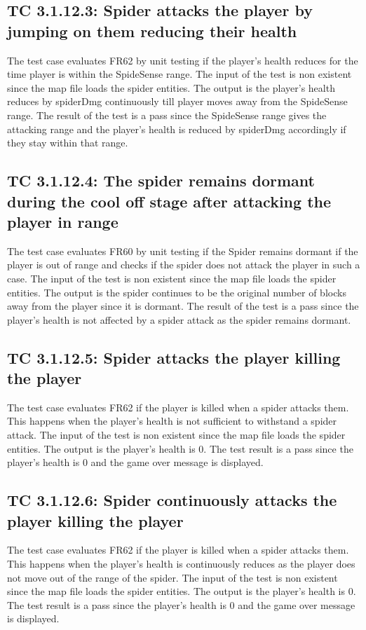 \documentclass[12pt, titlepage]{article}
\begin{document}
\subsection*{TC 3.1.12.3: Spider attacks the player by jumping on them reducing their health}
The test case evaluates FR62 by unit testing if the player's health reduces for the time player is within the SpideSense range. The input of the test is non existent since the map file loads the spider entities. The output is the player's health reduces  by  spiderDmg  continuously  till player moves away from the SpideSense range. The result of the test is a pass since the SpideSense range gives the attacking range and the player's health is reduced by spiderDmg accordingly if they stay within that range.
\subsection*{TC 3.1.12.4: The spider remains dormant during the cool off stage after attacking the player in range}
The test case evaluates FR60 by unit testing if the Spider remains dormant if the player is out of range and checks if the spider does not attack the player in such a case. The input of the test is non existent since the map file loads the spider entities. The output is the spider continues to be the original number of blocks away from the player since it is dormant. The result of the test is a pass since the player's health is not affected by a spider attack as the spider remains dormant.
\subsection*{TC 3.1.12.5: Spider attacks the player killing the player}
The test case evaluates FR62 if the player is killed when a spider attacks them. This happens when the player's health is not sufficient to withstand a spider attack. The input of the test is non existent since the map file loads the spider entities. The output is the player's health is 0. The test result is a pass since the player's health is 0 and the game over message is displayed.
\subsection*{TC 3.1.12.6: Spider continuously attacks the player killing the player}
The test case evaluates FR62 if the player is killed when a spider attacks them. This happens when the player's health is continuously reduces as the player does not move out of the range of the spider. The input of the test is non existent since the map file loads the spider entities. The output is the player's health is 0. The test result is a pass since the player's health is 0 and the game over message is displayed.
\end{document}
